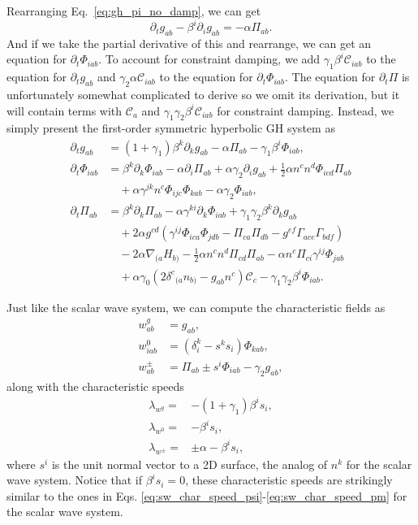 \begin{bibunit}[unsrtnat]
Rearranging Eq.~\ref{eq:gh_pi_no_damp}, we can get
\begin{equation}
   \partial_t g_{ab} - \beta^i\partial_i g_{ab} = -\alpha\Pi_{ab}.
\end{equation}
And if we take the partial derivative of this and rearrange, we can get an
equation for $\partial_t\Phi_{iab}$. To account for constraint damping, we add
$\gamma_1\beta^i\mathcal{C}_{iab}$ to the equation for $\partial_t g_{ab}$ and 
$\gamma_2\alpha\mathcal{C}_{iab}$ to the equation for $\partial_t \Phi_{iab}$.
The equation for $\partial_t \Pi$ is unfortunately somewhat complicated to
derive so we omit its derivation, but it will contain terms with $\mathcal{C}_a$ and
$\gamma_1\gamma_2\beta^i\mathcal{C}_{iab}$ for constraint damping. Instead, we
simply present the first-order symmetric hyperbolic GH system as
\begin{align}
  \partial_t g_{ab}
  &=\left(1+\gamma_1\right)\beta^k\partial_k g_{ab}
    -\alpha \Pi_{ab}-\gamma_1\beta^i\Phi_{iab}, \label{eq:intro_gh_g}\\
  \partial_t\Phi_{iab}
  &=\beta^k\partial_k\Phi_{iab} - \alpha \partial_i\Pi_{ab}
    + \alpha \gamma_2\partial_ig_{ab}
    +\frac{1}{2}\alpha n^c n^d\Phi_{icd}\Pi_{ab} \nonumber \\
  &\quad+ \alpha \gamma^{jk}n^c\Phi_{ijc}\Phi_{kab}
    -\alpha \gamma_2\Phi_{iab}, \label{eq:intro_gh_phi}\\
  \partial_t\Pi_{ab}
  &=\beta^k\partial_k\Pi_{ab} - \alpha \gamma^{ki}\partial_k\Phi_{iab}
    + \gamma_1\gamma_2\beta^k\partial_kg_{ab} \nonumber \\
  &\quad+2\alpha g^{cd}\left(\gamma^{ij}\Phi_{ica}\Phi_{jdb}
    - \Pi_{ca}\Pi_{db} - g^{ef}\Gamma_{ace}\Gamma_{bdf}\right) \nonumber \\
  &\quad-2\alpha \nabla_{(a}H_{b)}
    - \frac{1}{2}\alpha n^c n^d\Pi_{cd}\Pi_{ab}
    - \alpha n^c \Pi_{ci}\gamma^{ij}\Phi_{jab} \nonumber \\
  &\quad+\alpha \gamma_0\left(2\delta^c{}_{(a} n_{b)}
    - g_{ab}n^c\right)\mathcal{C}_c -\gamma_1\gamma_2 \beta^i\Phi_{iab}. \label{eq:intro_gh_pi}
\end{align}

Just like the scalar wave system, we can compute the characteristic fields as
\begin{align}
  w^{g}_{ab} &= g_{ab}, \\
  w^{0}_{iab} &= (\delta^k_i-s^k s_i)\Phi_{kab}, \\
  w^{\pm}_{ab} &= \Pi_{ab}\pm s^i\Phi_{iab} -\gamma_2 g_{ab},
\end{align}
along with the characteristic speeds
\begin{align}
  \lambda_{w^g} =& -(1+\gamma_1)\beta^i s_i, \\
  \lambda_{w^0} =& -\beta^i s_i, \\
  \lambda_{w^\pm} =& \pm \alpha - \beta^i s_i,
\end{align}
where $s^i$ is the unit normal vector to a 2D surface, the analog of $n^k$ for
the scalar wave system. Notice that if $\beta^is_i=0$, these
characteristic speeds are strikingly similar to the ones in Eqs.
\ref{eq:sw_char_speed_psi}-\ref{eq:sw_char_speed_pm} for the scalar
wave system.


\end{bibunit}
